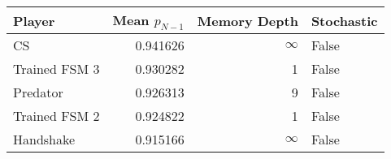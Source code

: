 \begin{tabular}{lrrl}
\toprule
        Player &  Mean $p_{N-1}$ &  Memory Depth & Stochastic \\
\midrule
            CS &        0.941626 &            \(\infty\) &      False \\
 Trained FSM 3 &        0.930282 &             1 &      False \\
      Predator &        0.926313 &             9 &      False \\
 Trained FSM 2 &        0.924822 &             1 &      False \\
     Handshake &        0.915166 &            \(\infty\) &      False \\
\bottomrule
\end{tabular}
